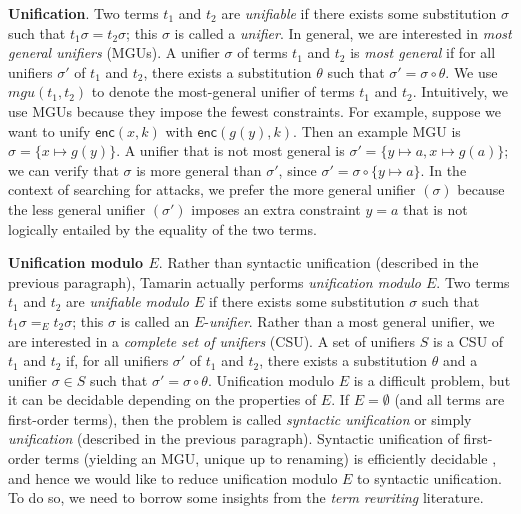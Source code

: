 \documentclass{article}
\theoremstyle{definition}
\begin{document}
\textbf{Unification}.  
Two terms $t_1$ and $t_2$ are \emph{unifiable} if there exists some substitution $\sigma$ 
such that $ t_1 \sigma =  t_2\sigma$; 
this $\sigma$ is called a \emph{unifier}. 
In general, we are interested in \emph{most general unifiers} (MGUs). A 
unifier $\sigma$ of terms $t_1$ and $t_2$ is \emph{most general} if for all 
unifiers $\sigma'$ of $t_1$ and $t_2$, there exists a substitution $\theta$ such that 
$\sigma' = \sigma \circ \theta$.
We use $\mathit{mgu}(t_1, t_2)$ to denote the most-general unifier of terms $t_1$ and $t_2$.
Intuitively, we use MGUs because they impose the fewest constraints.
For example, suppose we want to unify $\mathsf{enc}(x, k)$ with $\mathsf{enc}(g(y), k)$. 
Then an example MGU is $\sigma = \{ x \mapsto g(y) \}$. 
A unifier that is not most general is $\sigma' = \{ y \mapsto a, x \mapsto g(a) \}$; 
we can verify that $\sigma$ is more general than $\sigma'$, since $\sigma' = \sigma \circ \{ y \mapsto a \}$. 
In the context of searching for attacks, we prefer the more general unifier $(\sigma)$ 
because the less general unifier $(\sigma')$ imposes an extra constraint $y = a$ 
that is not logically entailed by the equality of the two terms.

\textbf{Unification modulo $E$}. 
Rather than syntactic unification (described in the previous paragraph), 
Tamarin actually performs \emph{unification modulo $E$}. 
Two terms $t_1$ and $t_2$ are \emph{unifiable modulo $E$} if there exists some substitution $\sigma$ 
such that $ t_1 \sigma =_E  t_2\sigma$; 
this $\sigma$ is called an $E$-\emph{unifier}. 
Rather than a most general unifier, we are interested in a \emph{complete set of unifiers} (CSU).
A set of unifiers $S$ is a CSU of $t_1$ and $t_2$ if, for all unifiers $\sigma'$ of $t_1$ and $t_2$, 
there exists a substitution $\theta$ and a unifier $\sigma \in S$ such that 
$\sigma' = \sigma \circ \theta$.
Unification modulo $E$ is a difficult problem, but it can be decidable depending on the properties of $E$. 
If $E=\emptyset$ (and all terms are first-order terms), then the problem is called \emph{syntactic unification} 
or simply \emph{unification} (described in the previous paragraph). 
Syntactic unification of first-order terms (yielding an MGU, unique up to renaming) is efficiently decidable \cite{unification_algo},
and hence we would like to reduce unification modulo $E$ to syntactic unification.
To do so, we need to borrow some insights from the \emph{term rewriting} literature.
\end{document}
